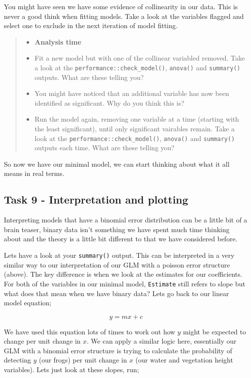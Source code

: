 \documentclass[
]{book}
\providecommand{\tightlist}{%
  \setlength{\itemsep}{0pt}\setlength{\parskip}{0pt}}
\begin{document}
You might have seen we have some evidence of collinearity in our data. This is never a good think when fitting models. Take a look at the variables flagged and select one to exclude in the next iteration of model fitting.

\begin{quote}
\begin{itemize}
\tightlist
\item
  \textbf{Analysis time}
\item
  Fit a new model but with one of the collinear variabled removed. Take a look at the \texttt{performance::check\_model()}, \texttt{anova()} and \texttt{summary()} outputs. What are these telling you?
\item
  You might have noticed that an additional variable has now been identified as significant. Why do you think this is?
\item
  Run the model again, removing one variable at a time (starting with the least significant), until only significant vairables remain. Take a look at the \texttt{performance::check\_model()}, \texttt{anova()} and \texttt{summary()} outputs each time. What are these telling you?
\end{itemize}
\end{quote}

So now we have our minimal model, we can start thinking about what it all means in real terms.

\subsection{Task 9 - Interpretation and plotting}\label{task-9---interpretation-and-plotting}

Interpreting models that have a binomial error distribution can be a little bit of a brain teaser, binary data isn't something we have spent much time thinking about and the theory is a little bit different to that we have considered before.

Lets have a look at your \texttt{summary()} output. This can be interpreted in a very similar way to our interpretation of our GLM with a poisson error structure (above). The key difference is when we look at the estimates for our coefficients. For both of the variables in our minimal model, \texttt{Estimate} still refers to slope but what does that mean when we have binary data? Lets go back to our linear model equation;

\[
y = mx + c
\]

We have used this equation lots of times to work out how \(y\) might be expected to change per unit change in \(x\). We can apply a similar logic here, essentially our GLM with a binomial error structure is trying to calculate the probability of detecting \(y\) (our frogs) per unit change in \(x\) (our water and vegetation height variables). Lets just look at these slopes, run;
\end{document}
